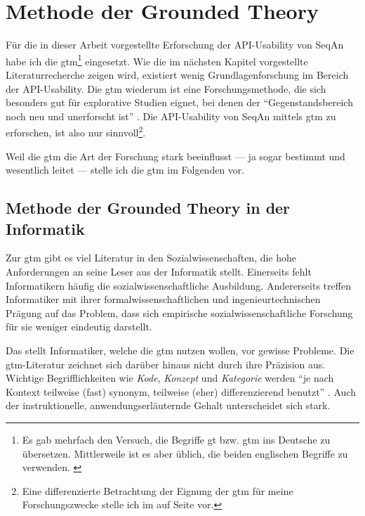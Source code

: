 \section{Methode der Grounded Theory}
\label{sec:gtm}

Für die in dieser Arbeit vorgestellte Erforschung der API-Usability von SeqAn habe ich die \acrfull{gtm}\footnote{Es gab mehrfach den Versuch, die Begriffe \gls{gt} bzw. \gls{gtm} ins Deutsche zu übersetzen. Mittlerweile ist es aber üblich, die beiden englischen Begriffe zu verwenden. \citep{Mey2007}} eingesetzt. Wie die im nächsten Kapitel vorgestellte Literaturrecherche zeigen wird, existiert wenig Grundlagenforschung im Bereich der API-Usability. Die \gls{gtm} wiederum ist eine Forschungsmethode, die sich besonders gut für explorative Studien eignet, bei denen der ``Gegenstandsbereich noch neu und unerforscht ist'' \citep[][S. 107]{mayring2002einfhrung}. Die API-Usability von SeqAn mittels \gls{gtm} zu erforschen, ist also nur sinnvoll\footnote{Eine differenzierte Betrachtung der Eignung der \gls{gtm} für meine Forschungszwecke stelle ich im  auf Seite \pageref{sec:phase4} vor.}.

Weil die \gls{gtm} die Art der Forschung stark beeinflusst --- ja sogar bestimmt und wesentlich leitet --- stelle ich die \gls{gtm} im Folgenden vor.



\subsection{Methode der Grounded Theory in der Informatik}
\label{sec:gtm-informatik}

Zur \gls{gtm} gibt es viel Literatur in den Sozialwissenschaften, die hohe Anforderungen an seine Leser aus der Informatik stellt. Einerseits fehlt Informatikern häufig die sozialwissenschaftliche Ausbildung. Andererseits treffen Informatiker mit ihrer formalwissenschaftlichen und ingenieurtechnischen Prägung auf das Problem, dass sich empirische sozialwissenschaftliche Forschung für sie weniger eindeutig darstellt.

Das stellt Informatiker, welche die \gls{gtm} nutzen wollen, vor gewisse Probleme. Die \gls{gtm}-Literatur zeichnet sich darüber hinaus nicht durch ihre Präzision aus. Wichtige Begrifflichkeiten wie \textit{Kode}, \textit{Konzept} und \textit{Kategorie} werden ``je nach Kontext teilweise (fast) synonym, teilweise (eher) differenzierend benutzt'' \citep{MuhlmeyerMentzel:2011vs}. Auch der instruktionelle, anwendungserläuternde Gehalt unterscheidet sich stark.

